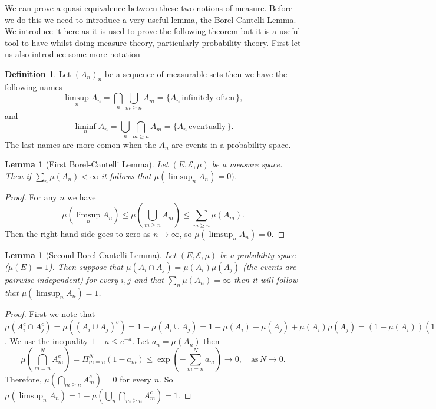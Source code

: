 \documentclass[11pt]{article}
\newtheorem{lem}[thm]{Lemma}
\theoremstyle{definition}
\newtheorem{dfn}[thm]{Definition}
\theoremstyle{remark}
\begin{document}
We can prove a quasi-equivalence between these two notions of measure. Before we do this we need to introduce a very useful lemma, the Borel-Cantelli Lemma. We introduce it here as it is used to prove the following theorem but it is a useful tool to have whilst doing measure theory, particularly probability theory. First let us also introduce some more notation
\begin{dfn}
Let $(A_n)_n$ be a sequence of measurable sets then we have the following names
\[ \limsup_n A_n = \bigcap_n \bigcup_{m \geq n} A_m = \{ A_n \, \mbox{infinitely often}\,\}, \] and
\[ \liminf_n A_n = \bigcup_n \bigcap_{m \geq n} A_m = \{ A_n \, \mbox{eventually}\,\}. \] The last names are more comon when the $A_n$ are events in a probability space.
\end{dfn}
\begin{lem}[First Borel-Cantelli Lemma]
Let $(E, \mathcal{E}, \mu)$ be a measure space. Then if $\sum_n \mu(A_n) < \infty$ it follows that $\mu(\limsup_n A_n) = 0)$.
\end{lem}
\begin{proof} For any $n$ we have
\[ \mu(\limsup_n A_n) \leq \mu \left( \bigcup_{m \geq n} A_m\right) \leq \sum_{m \geq n} \mu(A_m). \] Then the right hand side goes to zero as $n \rightarrow \infty$, so $\mu(\limsup_n A_n) = 0$.
\end{proof}

\begin{lem}[Second Borel-Cantelli Lemma]
Let $(E, \mathcal{E}, \mu)$ be a probability space ($\mu(E) =1$). Then suppose that $\mu(A_i \cap A_j) = \mu(A_i)\mu(A_j)$ (the events are pairwise independent) for every $i,j$ and that $\sum_n \mu(A_n) = \infty$ then it will follow that $\mu(\limsup_n A_n) =1$.
\end{lem}
\begin{proof}
First we note that $\mu(A_i^c \cap A_j^c) = \mu ((A_i \cup A_j)^c) = 1 - \mu(A_i \cup A_j) = 1 - \mu(A_i) - \mu(A_j)+ \mu(A_i)\mu(A_j) = (1-\mu(A_i))(1-\mu(A_j))$.
We use the inequality $1-a \leq e^{-a}$. Let $a_n = \mu(A_n)$ then 
\[ \mu \left( \bigcap_{m=n}^N A_m^c \right) = \Pi_{m=n}^N (1-a_m) \leq \exp \left( - \sum_{m=n}^N a_m \right) \rightarrow 0, \quad \mbox{as}\, N \rightarrow 0. \]
Therefore, $\mu \left( \bigcap_{m \geq n} A_m^c \right) = 0$ for every $n$. So $\mu(\limsup_n A_n ) = 1- \mu(\bigcup_n \bigcap_{m \geq n} A_m^c) = 1$. 
\end{proof}
\end{document}
